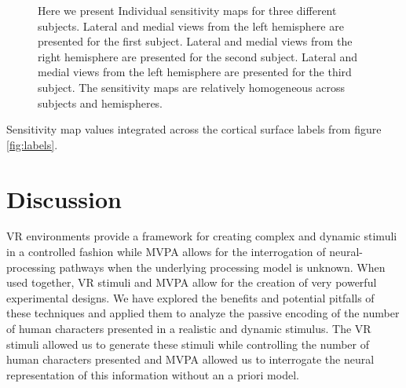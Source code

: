 \documentclass[preprint,5p,authoryear]{elsarticle}
\begin{document}
\begin{figure}[p]
\begin{subfigure}{0.3\textwidth}
\caption{}
\label{fig:s3-lh-medial-sensitivity}
\end{subfigure}
\caption{Here we present Individual sensitivity maps for three different subjects. 
Lateral  and medial  views from the left hemisphere are presented for the first subject.
Lateral  and medial  views from the right hemisphere are presented for the second subject.
Lateral  and medial  views from the left hemisphere are presented for the third subject.
The sensitivity maps are relatively homogeneous across subjects and hemispheres.}
\label{fig:individual-sensitivity}
\end{figure}

\begin{table}[p]
\centering

\caption{Sensitivity map values integrated across the cortical surface labels from figure \ref{fig:labels}.}
\label{tab:full-sensitivity}
\end{table}

\section{Discussion}
VR environments provide a framework for creating  complex and dynamic stimuli in a controlled fashion while MVPA allows for the interrogation of neural-processing pathways when the underlying processing model is unknown.
When used together, VR stimuli and MVPA allow for the creation of very powerful experimental designs.
We have explored the benefits and potential pitfalls of these techniques and applied them to analyze the passive encoding of the number of human characters presented in a realistic and dynamic stimulus.
The VR stimuli allowed us to generate these stimuli while controlling the number of human characters presented and MVPA allowed us to interrogate the neural representation of this information without an a priori model.
\end{document}
